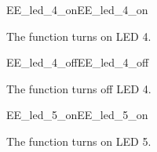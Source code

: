 \begin{function_nopb2}{EE\_led\_4\_on}{EE_led_4_on}
  
  \begin{fundescription}
    The function turns on LED 4.
  \end{fundescription}
  
  
  
\end{function_nopb2}

\begin{function_nopb2}{EE\_led\_4\_off}{EE_led_4_off}
  
  \begin{fundescription}
    The function turns off LED 4.
  \end{fundescription}
  
  
  
\end{function_nopb2}

\begin{function_nopb2}{EE\_led\_5\_on}{EE_led_5_on}
  
  \begin{fundescription}
    The function turns on LED 5.
  \end{fundescription}
  
  
  
\end{function_nopb2}

